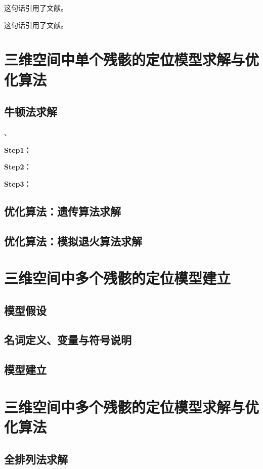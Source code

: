\documentclass[withoutpreface,bwprint]{cumcmthesis}
\begin{document}
这句话引用了文献\cite{司守奎2011数学建模算法与应用}。

这句话引用了文献。

\section{三维空间中单个残骸的定位模型求解与优化算法}

\subsection{牛顿法求解}、

\textbf{Step1：} 

\textbf{Step2：} 

\textbf{Step3：} 

\subsection{优化算法：遗传算法求解}

\subsection{优化算法：模拟退火算法求解}


\section{三维空间中多个残骸的定位模型建立}

\subsection{模型假设}

\subsection{名词定义、变量与符号说明}

\subsection{模型建立}

\section{三维空间中多个残骸的定位模型求解与优化算法}

\subsection{全排列法求解}
\end{document}
